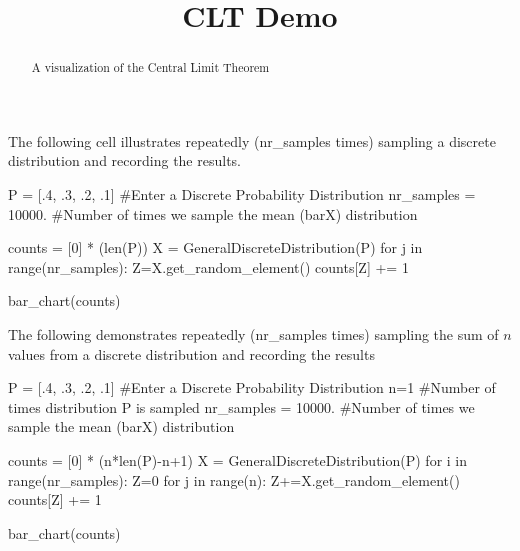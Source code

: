 \documentclass{ximera}
\title{CLT Demo}
\begin{document}
      
\begin{abstract}
      
A visualization of the Central Limit Theorem      
\end{abstract}
      
\maketitle

The following cell illustrates repeatedly (nr\_samples times) sampling a discrete distribution and recording the results.
      
 \begin{sageCell}
P = [.4, .3, .2, .1] #Enter a Discrete Probability Distribution
nr_samples = 10000. #Number of times we sample the mean (bar{X}) distribution  


counts = [0] * (len(P))
X = GeneralDiscreteDistribution(P)
for j in range(nr_samples):
    Z=X.get_random_element()
    counts[Z] += 1

    
    
    
bar_chart(counts)

 \end{sageCell}


The following demonstrates repeatedly  (nr\_samples times) sampling the sum of $n$ values from a discrete distribution and recording the results

 \begin{sageCell}
P = [.4, .3, .2, .1] #Enter a Discrete Probability Distribution
n=1  #Number of times distribution P is sampled
nr_samples = 10000. #Number of times we sample the mean (bar{X}) distribution  


counts = [0] * (n*len(P)-n+1)
X = GeneralDiscreteDistribution(P)
for i in range(nr_samples):
    Z=0
    for j in range(n):
        Z+=X.get_random_element()
    counts[Z] += 1

    
    
    
bar_chart(counts)

 \end{sageCell}


 
 
 
 
      
\end{document}
